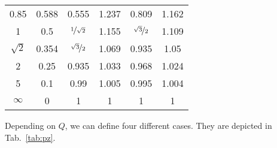 \documentclass{article}[11pt]
\begin{document}
\begin{table}[H]
\begin{tabular}{cccccc}
0.85                     & 0.588                     & 0.555                                      & 1.237                                                                                            & 0.809                                      & 1.162                                                                                            \\  
1                        & 0.5                       & $\nicefrac{1}{\sqrt{2}}$                   & 1.155                                                                                            & $\nicefrac{\sqrt{3}}{2}$                   & 1.109                                                                                            \\  
$\sqrt{2}$               & 0.354                     & $\nicefrac{\sqrt{3}}{2}$                   & 1.069                                                                                            & 0.935                                      & 1.05                                                                                             \\
2                        & 0.25                      & 0.935                                      & 1.033                                                                                            & 0.968                                      & 1.024                                                                                            \\ 
5                        & 0.1                       & 0.99                                       & 1.005                                                                                            & 0.995                                      & 1.004                                                                                            \\ 
$\infty$                 & 0                         & 1                                          & 1                                                                                                & 1                                          & 1                                                                                                \\ \toprule
\end{tabular}
\label{tab:char-fs}
\end{table}

Depending on $Q$, we can define four different cases. 
They are depicted in Tab.~\ref{tab:pz}.
\end{document}
